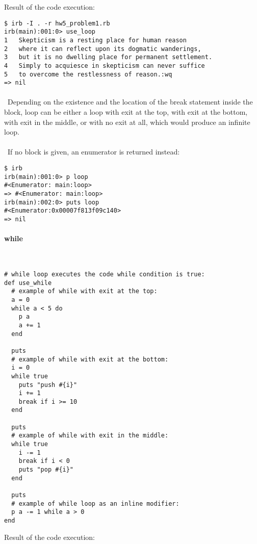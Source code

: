 \documentclass{article}
\begin{document}
Result of the code execution:

\begin{verbatim} 
$ irb -I . -r hw5_problem1.rb
irb(main):001:0> use_loop
1	Skepticism is a resting place for human reason
2	where it can reflect upon its dogmatic wanderings,
3	but it is no dwelling place for permanent settlement.
4	Simply to acquiesce in skepticism can never suffice
5	to overcome the restlessness of reason.:wq
=> nil
\end{verbatim}
\paragraph{}\
Depending on the existence and the location of the break statement inside the block, loop can be either a loop with exit at the top, with exit at the bottom, with exit in the middle, or with no exit at all, which would produce an infinite loop. 
\paragraph{}\
If no block is given, an enumerator is returned instead:
\begin{verbatim} 
$ irb
irb(main):001:0> p loop
#<Enumerator: main:loop>
=> #<Enumerator: main:loop>
irb(main):002:0> puts loop
#<Enumerator:0x00007f813f09c140>
=> nil
\end{verbatim}

\paragraph{ while}\

\begin{verbatim}
# while loop executes the code while condition is true:
def use_while
  # example of while with exit at the top:
  a = 0
  while a < 5 do
    p a
    a += 1
  end

  puts
  # example of while with exit at the bottom:
  i = 0
  while true
    puts "push #{i}"
    i += 1
    break if i >= 10
  end

  puts
  # example of while with exit in the middle:
  while true
    i -= 1
    break if i < 0
    puts "pop #{i}"
  end
  
  puts
  # example of while loop as an inline modifier:
  p a -= 1 while a > 0
end
\end{verbatim}

Result of the code execution:
\end{document}
